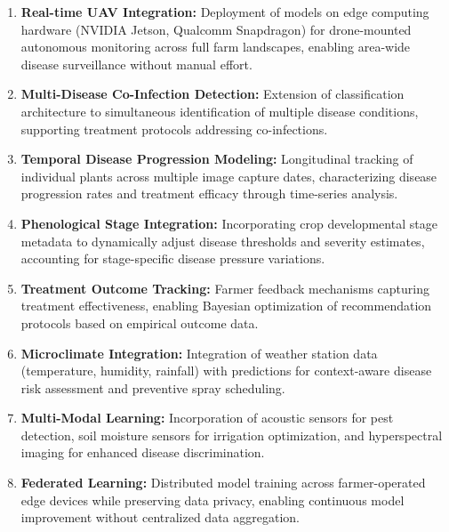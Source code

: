 \documentclass[conference]{IEEEtran}
\begin{document}
\begin{enumerate}
\item \textbf{Real-time UAV Integration:} Deployment of models on edge computing hardware (NVIDIA Jetson, Qualcomm Snapdragon) for drone-mounted autonomous monitoring across full farm landscapes, enabling area-wide disease surveillance without manual effort.

\item \textbf{Multi-Disease Co-Infection Detection:} Extension of classification architecture to simultaneous identification of multiple disease conditions, supporting treatment protocols addressing co-infections.

\item \textbf{Temporal Disease Progression Modeling:} Longitudinal tracking of individual plants across multiple image capture dates, characterizing disease progression rates and treatment efficacy through time-series analysis.

\item \textbf{Phenological Stage Integration:} Incorporating crop developmental stage metadata to dynamically adjust disease thresholds and severity estimates, accounting for stage-specific disease pressure variations.

\item \textbf{Treatment Outcome Tracking:} Farmer feedback mechanisms capturing treatment effectiveness, enabling Bayesian optimization of recommendation protocols based on empirical outcome data.

\item \textbf{Microclimate Integration:} Integration of weather station data (temperature, humidity, rainfall) with predictions for context-aware disease risk assessment and preventive spray scheduling.

\item \textbf{Multi-Modal Learning:} Incorporation of acoustic sensors for pest detection, soil moisture sensors for irrigation optimization, and hyperspectral imaging for enhanced disease discrimination.

\item \textbf{Federated Learning:} Distributed model training across farmer-operated edge devices while preserving data privacy, enabling continuous model improvement without centralized data aggregation.
\end{enumerate}
\end{document}
